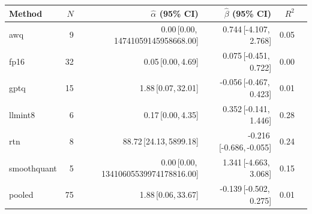 \begin{tabular}{lrrrrr}
  \toprule
  Method & $N$ & $\hat{\alpha}$ (95\% CI) & $\hat{\beta}$ (95\% CI) & $R^2$ \\
  \midrule
  awq & 9 & 0.00\,[0.00,\,14741059145958668.00] & 0.744\,[-4.107,\,2.768] & 0.05 \\
  fp16 & 32 & 0.05\,[0.00,\,4.69] & 0.075\,[-0.451,\,0.722] & 0.00 \\
  gptq & 15 & 1.88\,[0.07,\,32.01] & -0.056\,[-0.467,\,0.423] & 0.01 \\
  llmint8 & 6 & 0.17\,[0.00,\,4.35] & 0.352\,[-0.141,\,1.446] & 0.28 \\
  rtn & 8 & 88.72\,[24.13,\,5899.18] & -0.216\,[-0.686,\,-0.055] & 0.24 \\
  smoothquant & 5 & 0.00\,[0.00,\,13410605539974178816.00] & 1.341\,[-4.663,\,3.068] & 0.15 \\
  pooled & 75 & 1.88\,[0.06,\,33.67] & -0.139\,[-0.502,\,0.275] & 0.01 \\
  \bottomrule
\end{tabular}
